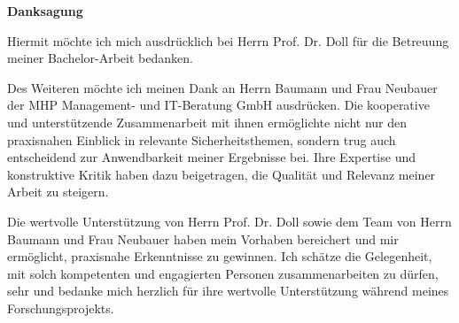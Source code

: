\vspace*{0.5cm}
\begin{center}
   \huge{\textbf{Danksagung}}
\end{center}

\thispagestyle{empty}
\vspace{3cm}

Hiermit möchte ich mich ausdrücklich bei Herrn Prof. Dr. Doll für die Betreuung meiner Bachelor-Arbeit bedanken. 

Des Weiteren möchte ich meinen Dank an Herrn Baumann und Frau Neubauer der MHP Management- und IT-Beratung GmbH ausdrücken. Die kooperative und unterstützende Zusammenarbeit mit ihnen ermöglichte nicht nur den praxisnahen Einblick in relevante Sicherheitsthemen, sondern trug auch entscheidend zur Anwendbarkeit meiner Ergebnisse bei. Ihre Expertise und konstruktive Kritik haben dazu beigetragen, die Qualität und Relevanz meiner Arbeit zu steigern.

Die wertvolle Unterstützung von Herrn Prof. Dr. Doll sowie dem Team von Herrn Baumann und Frau Neubauer haben mein Vorhaben bereichert und mir ermöglicht, praxisnahe Erkenntnisse zu gewinnen. Ich schätze die Gelegenheit, mit solch kompetenten und engagierten Personen zusammenarbeiten zu dürfen, sehr und bedanke mich herzlich für ihre wertvolle Unterstützung während meines Forschungsprojekts.
